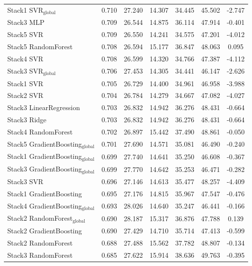\begin{table}
{\begin{tabular}{p{4.5cm}cccccc}
        Stack1 SVR$_{\text{global}}$ & 0.710 & 27.240 & 14.307 & 34.445 & 45.502 & -2.747 \\
        Stack3 MLP & 0.709 & 26.544 & 14.875 & 36.114 & 47.914 & -0.401 \\
        Stack5 SVR & 0.709 & 26.550 & 14.241 & 34.575 & 47.201 & -4.012 \\
        Stack5 RandomForest & 0.708 & 26.594 & 15.177 & 36.847 & 48.063 & 0.095 \\
        Stack4 SVR & 0.708 & 26.599 & 14.320 & 34.766 & 47.387 & -4.112 \\
        Stack3 SVR$_{\text{global}}$ & 0.706 & 27.453 & 14.305 & 34.441 & 46.147 & -2.626 \\
        Stack1 SVR & 0.705 & 26.729 & 14.400 & 34.961 & 46.958 & -3.988 \\
        Stack2 SVR & 0.704 & 26.784 & 14.279 & 34.667 & 47.082 & -4.027 \\
        Stack3 LinearRegression & 0.703 & 26.832 & 14.942 & 36.276 & 48.431 & -0.664 \\
        Stack3 Ridge & 0.703 & 26.832 & 14.942 & 36.276 & 48.431 & -0.664 \\
        Stack4 RandomForest & 0.702 & 26.897 & 15.442 & 37.490 & 48.861 & -0.050 \\
        Stack5 GradientBoosting$_{\text{global}}$ & 0.701 & 27.690 & 14.571 & 35.081 & 46.490 & -0.240 \\
        Stack1 GradientBoosting$_{\text{global}}$ & 0.699 & 27.740 & 14.641 & 35.250 & 46.608 & -0.367 \\
        Stack3 GradientBoosting$_{\text{global}}$ & 0.699 & 27.770 & 14.642 & 35.253 & 46.471 & -0.282 \\
        Stack3 SVR & 0.696 & 27.146 & 14.613 & 35.477 & 48.257 & -4.409 \\
        Stack1 GradientBoosting & 0.695 & 27.176 & 14.815 & 35.967 & 47.547 & -0.476 \\
        Stack4 GradientBoosting$_{\text{global}}$ & 0.693 & 28.026 & 14.640 & 35.247 & 46.441 & -0.166 \\
        Stack2 RandomForest$_{\text{global}}$ & 0.690 & 28.187 & 15.317 & 36.876 & 47.788 & 0.139 \\
        Stack2 GradientBoosting & 0.690 & 27.429 & 14.710 & 35.714 & 47.413 & -0.599 \\
        Stack2 RandomForest & 0.688 & 27.488 & 15.562 & 37.782 & 48.807 & -0.134 \\
        Stack3 RandomForest & 0.685 & 27.622 & 15.914 & 38.636 & 49.763 & -0.395 \\

\end{tabular}}
\end{table}
